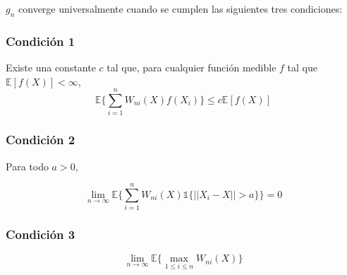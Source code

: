 \documentclass[12pt, a4paper]{article}
\begin{document}
$g_n$ converge universalmente cuando se cumplen las siguientes tres condiciones:

\subsubsection{Condición 1}
Existe una constante $c$ tal que, para cualquier función medible $f$ tal que $\mathds{E}[f(X)]<\infty$,
$$\mathds{E} \bigg \{ \sum_{i=1}^n W_{ni}(X)f(X_i) \bigg \} \leq c \mathds{E}[f(X)]$$

\subsubsection{Condición 2}
Para todo $a >0$,

$$\mathop{lim}_{ n \rightarrow \infty} \mathds{E} \bigg \{ \sum_{i=1}^n W_{ni}(X)\mathds{1}\{ || X_i -X ||>a \} \bigg \} = 0$$

\subsubsection{Condición 3}

$$ \mathop{lim}_{n \rightarrow \infty} \mathds{E} \bigg \{  \mathop{max}_{1 \leq i \leq n} W_{ni}(X)\bigg \} $$
\end{document}
